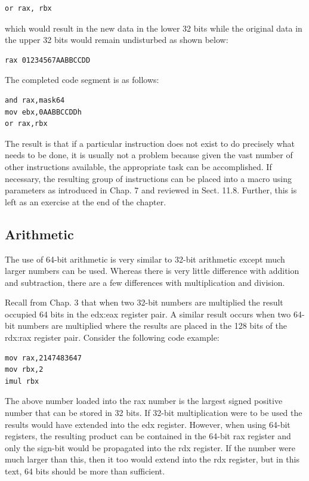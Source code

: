 \documentclass[10pt]{book}
\begin{document}
\begin{verbatim}
or rax, rbx
\end{verbatim}

which would result in the new data in the lower 32 bits while the original data in the upper 32 bits would remain undisturbed as shown below:


\begin{verbatim}
rax 01234567AABBCCDD
\end{verbatim}

The completed code segment is as follows:

\begin{verbatim}
and rax,mask64
mov ebx,0AABBCCDDh
or rax,rbx
\end{verbatim}

The result is that if a particular instruction does not exist to do precisely what needs to be done, it is usually not a problem because given the vast number of other instructions available, the appropriate task can be accomplished. If necessary, the resulting group of instructions can be placed into a macro using parameters as introduced in Chap. 7 and reviewed in Sect. 11.8. Further, this is left as an exercise at the end of the chapter.

\subsection{Arithmetic}
The use of 64-bit arithmetic is very similar to 32-bit arithmetic except much larger numbers can be used. Whereas there is very little difference with addition and subtraction, there are a few differences with multiplication and division.

Recall from Chap. 3 that when two 32-bit numbers are multiplied the result occupied 64 bits in the edx:eax register pair. A similar result occurs when two 64-bit numbers are multiplied where the results are placed in the 128 bits of the rdx:rax register pair. Consider the following code example:

\begin{verbatim}
mov rax,2147483647
mov rbx,2
imul rbx
\end{verbatim}

The above number loaded into the rax number is the largest signed positive number that can be stored in 32 bits. If 32-bit multiplication were to be used the results would have extended into the edx register. However, when using 64-bit registers, the resulting product can be contained in the 64-bit rax register and only the sign-bit would be propagated into the rdx register. If the number were much larger than this, then it too would extend into the rdx register, but in this text, 64 bits should be more than sufficient.
\end{document}
